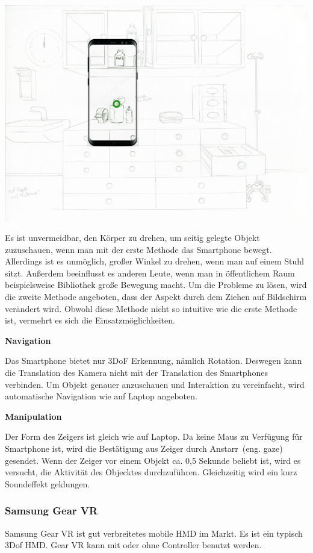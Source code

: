   \includegraphics[width=\textwidth]{images/paperPrototypewiths8mini.png}
  
  Es ist unvermeidbar, den Körper zu drehen, um seitig gelegte Objekt zuzuschauen, wenn man mit der erste Methode das Smartphone bewegt. Allerdings ist es unmöglich, großer Winkel zu drehen, wenn man auf einem Stuhl sitzt. Außerdem beeinflusst es anderen Leute, wenn man in öffentlichem Raum beispielsweise Bibliothek große Bewegung macht. Um die Probleme zu lösen, wird die zweite Methode angeboten, dass der Aspekt durch dem Ziehen auf Bildschirm verändert wird. Obwohl diese Methode nicht so intuitive wie die erste Methode ist, vermehrt es sich die Einsatzmöglichkeiten.
  
  \textbf{Navigation}
  
  Das Smartphone bietet nur 3DoF Erkennung, nämlich Rotation. Deswegen kann die Translation des Kamera nicht mit der Translation des Smartphones verbinden. Um Objekt genauer anzuschauen und Interaktion zu vereinfacht, wird automatische Navigation wie auf Laptop angeboten.
  
  \textbf{Manipulation}
  
  Der Form des Zeigers ist gleich wie auf Laptop. Da keine Maus zu Verfügung für Smartphone ist, wird die Bestätigung aus Zeiger durch \glqq Anstarr\grqq\ (eng. gaze) gesendet. Wenn der Zeiger vor einem Objekt ca. 0,5 Sekunde beliebt ist, wird es versucht, die Aktivität des Objecktes durchzuführen. Gleichzeitig wird ein kurz Soundeffekt geklungen.
  
 \subsubsection{Samsung Gear VR}
 Samsung Gear VR ist gut verbreitetes mobile HMD im Markt. Es ist ein typisch 3Dof HMD. Gear VR kann mit oder ohne Controller benutzt werden.
 
